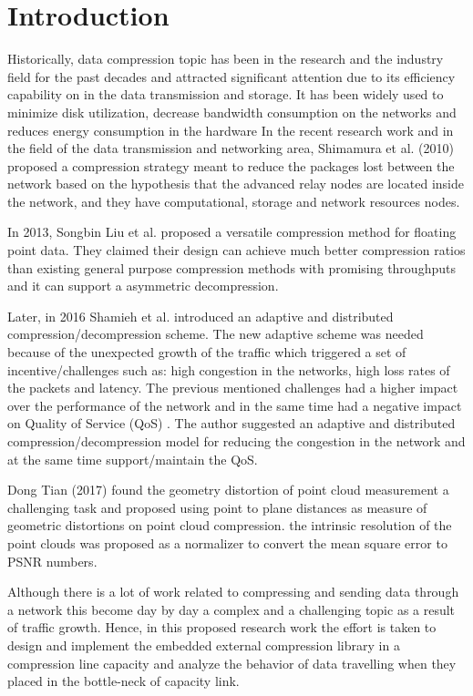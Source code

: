 \documentclass[sigconf]{acmart}
\begin{document}
\section{Introduction}
Historically, data compression \cite{lelewer1987data} topic has been in the research and the industry field for the past decades and attracted significant attention due to its efficiency capability on in the data transmission and storage. It has been widely used to minimize disk utilization, decrease bandwidth consumption on the networks and reduces energy consumption in the hardware \cite{welton2011improving}
In the recent research work and in the field of the data transmission and networking area, Shimamura et al. (2010) proposed a compression strategy meant to reduce the packages lost between the network based on the hypothesis that the advanced relay nodes are located inside the network, and they have computational, storage and network resources nodes\cite{shimamura2010compressing}. 

In 2013,  Songbin Liu et al. proposed a versatile compression method for floating point data. They claimed their design can achieve much better compression ratios than existing general purpose compression methods with promising throughputs and it can support a asymmetric decompression. \cite{liu2013versatile} 

Later, in 2016 Shamieh et al. \cite{shamieh2016adaptive} introduced  an adaptive and distributed compression/decompression scheme. The new adaptive scheme was needed because of the unexpected growth of the traffic which triggered a set of incentive/challenges such as: high congestion in the networks, high loss rates of the packets and latency. The previous mentioned challenges had a higher impact over the performance of the network and in the same time had a negative impact on Quality of Service (QoS) . The author suggested an adaptive and distributed compression/decompression model for reducing the congestion in the network and at the same time support/maintain the QoS.

Dong Tian (2017) found the geometry distortion of point cloud measurement  a challenging task and proposed using point to plane distances as measure of geometric distortions on point cloud compression. the intrinsic resolution of the point clouds was proposed as a normalizer to convert the mean square error to PSNR numbers. \cite{tian2017geometric}

Although there is a lot of work related to compressing and sending data through a network \cite{serfozo1999little}\cite{shimamura2010compressing}\cite{tan2010enhanced} this become day by day a complex and a challenging topic as a result of traffic growth. 
Hence, in this proposed research work the effort is taken to design and implement the embedded external compression library in a compression line capacity and analyze the behavior of data travelling when they placed in the bottle-neck of capacity link. 
\end{document}
